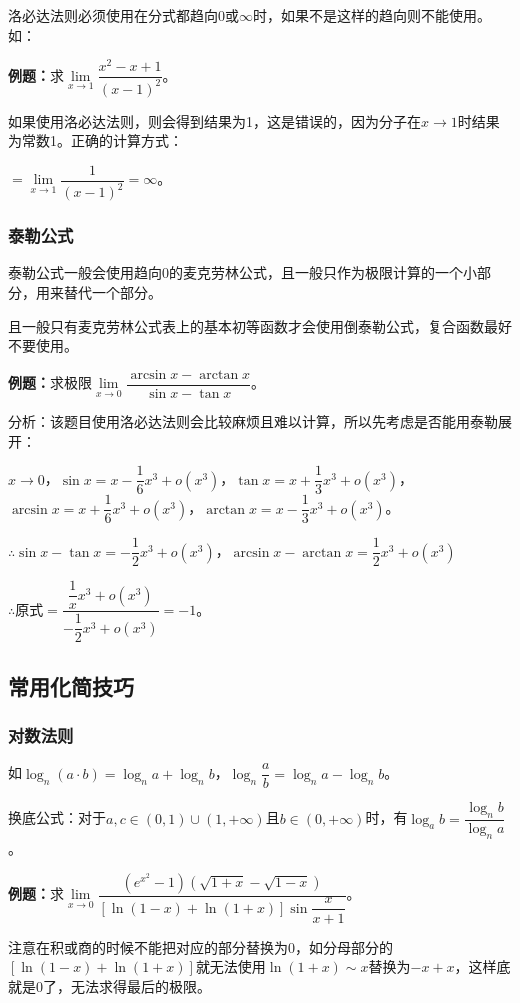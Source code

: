 \documentclass[UTF8, 12pt]{ctexart}
\begin{document}
洛必达法则必须使用在分式都趋向0或$\infty$时，如果不是这样的趋向则不能使用。如：

\textbf{例题：}求$\lim\limits_{x\to 1}\dfrac{x^2-x+1}{(x-1)^2}$。

如果使用洛必达法则，则会得到结果为1，这是错误的，因为分子在$x\to 1$时结果为常数1。正确的计算方式：

$=\lim\limits_{x\to 1}\dfrac{1}{(x-1)^2}=\infty$。

\subsubsection{泰勒公式}

泰勒公式一般会使用趋向0的麦克劳林公式，且一般只作为极限计算的一个小部分，用来替代一个部分。

且一般只有麦克劳林公式表上的基本初等函数才会使用倒泰勒公式，复合函数最好不要使用。

\textbf{例题：}求极限$\lim\limits_{x\to 0}\dfrac{\arcsin x-\arctan x}{\sin x-\tan x}$。\medskip

分析：该题目使用洛必达法则会比较麻烦且难以计算，所以先考虑是否能用泰勒展开：

$x\to 0$，$\sin x=x-\dfrac{1}{6}x^3+o(x^3)$，$\tan x=x+\dfrac{1}{3}x^3+o(x^3)$，$\arcsin x=x+\dfrac{1}{6}x^3+o(x^3)$，$\arctan x=x-\dfrac{1}{3}x^3+o(x^3)$。

$\therefore \sin x-\tan x=-\dfrac{1}{2}x^3+o(x^3)$，$\arcsin x-\arctan x=\dfrac{1}{2}x^3+o(x^3)$

$\therefore \text{原式}=\dfrac{\dfrac{1}{x}x^3+o(x^3)}{-\dfrac{1}{2}x^3+o(x^3)}=-1$。


\subsection{常用化简技巧}

\subsubsection{对数法则}

如$\log_n(a\cdot b)=\log_n a+\log_n b$，$\log_n\dfrac{a}{b}=\log_na-\log_nb$。

换底公式：对于$a,c\in(0,1)\cup(1,+\infty)$且$b\in(0,+\infty)$时，有$\log_ab=\dfrac{\log_nb}{\log_na}$。

\textbf{例题：}求$\lim\limits_{x\to 0}\dfrac{(e^{x^2}-1)(\sqrt{1+x}-\sqrt{1-x})}{[\ln(1-x)+\ln(1+x)]\sin\dfrac{x}{x+1}}$。

注意在积或商的时候不能把对应的部分替换为0，如分母部分的$[\ln(1-x)+\ln(1+x)]$就无法使用$\ln(1+x)\sim x$替换为$-x+x$，这样底就是0了，无法求得最后的极限。
\end{document}
